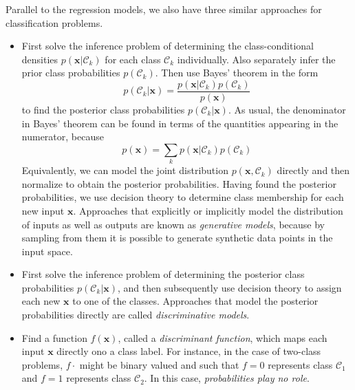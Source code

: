 \documentclass[a4paper]{book}
\renewcommand{\bf}{\mathbf}
\renewcommand{\cal}{\mathcal}
\newcommand{\imp}[1]{\textit{#1}}
\begin{document}
Parallel to the regression models, we also have three similar approaches for classification problems.
\begin{itemize}
\item First solve the inference problem of determining the class-conditional densities $p(\bf{x}|\cal{C}_k)$ for each class $\cal{C}_k$ individually. Also separately infer the prior class probabilities $p(\cal{C}_k)$. Then use Bayes' theorem in the form
\begin{equation}
	p(\cal{C}_k|\bf{x})=\frac{p(\bf{x}|\cal{C}_k)p(\cal{C}_k)}{p(\bf{x})}
\end{equation}
to find the posterior class probabilities $p(\cal{C}_k|\bf{x})$. As usual, the denominator in Bayes' theorem can be found in terms of the quantities appearing in the numerator, because
\begin{equation}
p(\bf{x}) = \sum_{k}p(\bf{x}|\cal{C}_k)p(\cal{C}_k)
\end{equation}
Equivalently, we can model the joint distribution $p(\bf{x},\cal{C}_k)$ directly and then normalize to obtain the posterior probabilities. Having found the posterior probabilities, we use decision theory to determine class membership for each new input $\bf{x}$. Approaches that explicitly or implicitly model the distribution of inputs as well as outputs are known as \imp{generative models}, because by sampling from them it is possible to generate synthetic data points in the input space.
\item First solve the inference problem of determining the posterior class probabilities $p(\cal{C}_k|\bf{x})$, and then subsequently use decision theory to assign each new $\bf{x}$ to one of the classes. Approaches that model the posterior probabilities directly are called \imp{discriminative models}.
\item Find a function $f(\bf{x})$, called a \imp{discriminant function}, which maps each input $\bf{x}$ directly ono a class label. For instance, in the case of two-class problems, $f{\cdot}$ might be binary valued and such that $f=0$ represents class $\cal{C}_1$ and $f=1$ represents class $\cal{C}_2$. In this case, \imp{probabilities play no role}.
\end{itemize}
\end{document}
